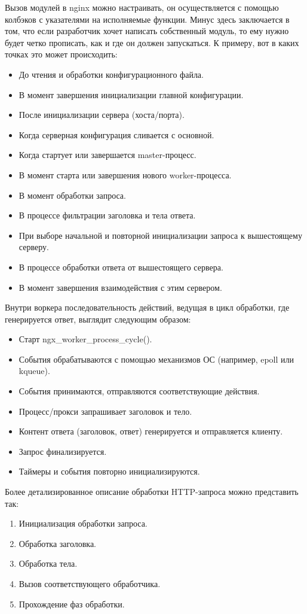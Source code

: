 \documentclass[14pt, a4paper]{article}
\begin{document}
Вызов модулей в nginx можно настраивать, он осуществляется с помощью колбэков с указателями на 
исполняемые функции. Минус здесь заключается в том, что если разработчик хочет написать собственный 
модуль, то ему нужно будет четко прописать, как и где он должен запускаться. К примеру, вот в каких 
точках это может происходить:
\begin{itemize}
    \item До чтения и обработки конфигурационного файла.
    \item В момент завершения инициализации главной конфигурации.
    \item После инициализации сервера (хоста/порта).
    \item Когда серверная конфигурация сливается с основной.
    \item Когда стартует или завершается master-процесс.
    \item В момент старта или завершения нового worker-процесса.
    \item В момент обработки запроса.
    \item В процессе фильтрации заголовка и тела ответа.
    \item При выборе начальной и повторной инициализации запроса к вышестоящему серверу.
    \item В процессе обработки ответа от вышестоящего сервера.
    \item В момент завершения взаимодействия с этим сервером.
\end{itemize}
Внутри воркера последовательность действий, ведущая в цикл обработки, где генерируется ответ, выглядит следующим образом:
\begin{itemize}
    \item Старт ngx\_worker\_process\_cycle().
    \item События обрабатываются с помощью механизмов ОС (например, epoll или kqueue).
    \item События принимаются, отправляются соответствующие действия.
    \item Процесс/прокси запрашивает заголовок и тело.
    \item Контент ответа (заголовок, ответ) генерируется и отправляется клиенту.
    \item Запрос финализируется.
    \item Таймеры и события повторно инициализируются.
\end{itemize}
Более детализированное описание обработки HTTP-запроса можно представить так:
\begin{enumerate}
    \item Инициализация обработки запроса.
    \item Обработка заголовка.
    \item Обработка тела.
    \item Вызов соответствующего обработчика.
    \item Прохождение фаз обработки.
\end{enumerate}
\end{document}
